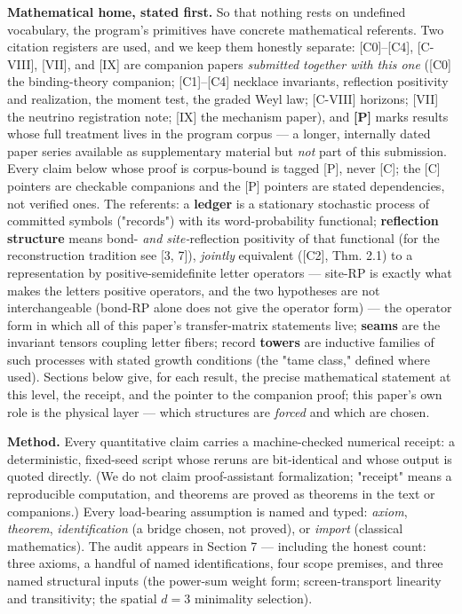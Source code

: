 \documentclass[11pt]{article}
\begin{document}
\textbf{Mathematical home, stated first.}  So that nothing rests on undefined vocabulary, the program's primitives have concrete mathematical referents.  Two citation registers are used, and we keep them honestly separate: [C0]–[C4], [C-VIII], [VII], and [IX] are companion papers \emph{submitted together with this one} ([C0] the binding-theory companion; [C1]–[C4] necklace invariants, reflection positivity and realization, the moment test, the graded Weyl law; [C-VIII] horizons; [VII] the neutrino registration note; [IX] the mechanism paper), and \textbf{[P]} marks results whose full treatment lives in the program corpus — a longer, internally dated paper series available as supplementary material but \emph{not} part of this submission.  Every claim below whose proof is corpus-bound is tagged [P], never [C]; the [C] pointers are checkable companions and the [P] pointers are stated dependencies, not verified ones.  The referents: a \textbf{ledger} is a stationary stochastic process of committed symbols ("records") with its word-probability functional; \textbf{reflection structure} means bond- \emph{and site-}reflection positivity of that functional (for the reconstruction tradition see [3, 7]), \emph{jointly} equivalent ([C2], Thm. 2.1) to a representation by positive-semidefinite letter operators — site-RP is exactly what makes the letters positive operators, and the two hypotheses are not interchangeable (bond-RP alone does not give the operator form) — the operator form in which all of this paper's transfer-matrix statements live; \textbf{seams} are the invariant tensors coupling letter fibers; record \textbf{towers} are inductive families of such processes with stated growth conditions (the "tame class," defined where used).  Sections below give, for each result, the precise mathematical statement at this level, the receipt, and the pointer to the companion proof; this paper's own role is the physical layer — which structures are \emph{forced} and which are chosen.

\textbf{Method.}  Every quantitative claim carries a machine-checked numerical receipt: a deterministic, fixed-seed script whose reruns are bit-identical and whose output is quoted directly.  (We do not claim proof-assistant formalization; "receipt" means a reproducible computation, and theorems are proved as theorems in the text or companions.)  Every load-bearing assumption is named and typed: \emph{axiom}, \emph{theorem}, \emph{identification} (a bridge chosen, not proved), or \emph{import} (classical mathematics).  The audit appears in Section 7 — including the honest count: three axioms, a handful of named identifications, four scope premises, and three named structural inputs (the power-sum weight form; screen-transport linearity and transitivity; the spatial $d = 3$ minimality selection).
\end{document}
